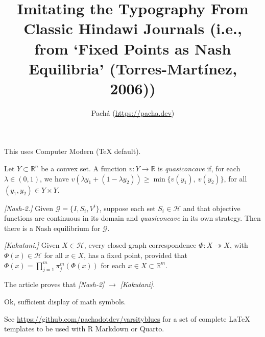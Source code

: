 \documentclass[letterpaper]{article}
\title{Imitating the Typography From Classic Hindawi Journals
(i.e., from `Fixed Points as Nash Equilibria' (Torres-Mart\'inez, 2006))}
\author{Pach\'a (\url{https://pacha.dev})}
\begin{document}
\maketitle

This uses Computer Modern (TeX default).

Let $Y \subset \mathbb{R}^n$ be a convex set. A function
$v: Y \rightarrow \mathbb{R}$ is \emph{quasiconcave} if, for each
$\lambda \in (0,1)$, we have
$v(\lambda y_1 + (1 - \lambda y_2)) \geq \min\{v(y_1),\: v(y_2) \}$, for all
$(y_1, y_2) \in Y \times Y$.

\emph{[Nash-2.]} Given $\mathcal{G}=\{I,S_i,V^i\}$, suppose each set
$S_i \in \mathcal{H}$ and that objective functions are continuous in its
domain and \emph{quasiconcave} in its own strategy. Then there is a Nash
equilibrium for $\mathcal{G}$.

\emph{[Kakutani.]} Given $X \in \mathcal{H}$, every closed-graph correspondence
$\Phi: X \twoheadrightarrow X$, with $\Phi(x) \in \mathcal{H}$ for all
$x \in X$, has a fixed point, provided that
$\Phi(x) = \prod_{j=1}^{m} \pi_j^m(\Phi(x))$ for each
$x \in X \subset \mathbb{R}^m$.

The article proves that \emph{[Nash-2]} $\rightarrow$ \emph{[Kakutani]}.

Ok, sufficient display of math symbols.

See \url{https://github.com/pachadotdev/varsityblues} for a set of complete
LaTeX templates to be used with R Markdown or Quarto.
\end{document}
